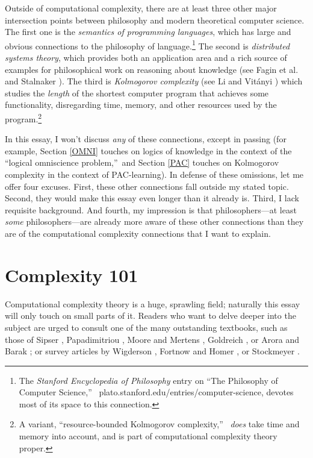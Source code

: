 \documentclass[12pt,onecolumn]{article}%
\begin{document}
Outside of computational complexity, there are at least three other major
intersection points between philosophy and modern theoretical computer
science. The first one is the \textit{semantics of programming languages},
which has large and obvious connections to the philosophy of
language.\footnote{The \textit{Stanford Encyclopedia of Philosophy} entry on
\textquotedblleft The Philosophy of Computer Science,\textquotedblright\ %
 plato.stanford.edu/entries/computer-science, devotes most of its space to
this connection.} The second is \textit{distributed systems theory}, which
provides both an application area and a rich source of examples for
philosophical work on reasoning about knowledge (see Fagin et al. \cite{fhmv}
and Stalnaker \cite{stalnaker}). The third is \textit{Kolmogorov complexity}
(see Li and Vit\'{a}nyi \cite{livitanyi}) which studies the \textit{length} of
the shortest computer program that achieves some functionality, disregarding
time, memory, and other resources used by the program.\footnote{A variant,
\textquotedblleft resource-bounded Kolmogorov complexity,\textquotedblright\ %
 \textit{does} take time and memory into account, and is part of
computational complexity theory proper.}

In this essay, I won't discuss \textit{any} of these connections, except in
passing (for example, Section \ref{OMNI} touches on logics of knowledge in
the context of the \textquotedblleft logical omniscience
problem,\textquotedblright\  and Section \ref{PAC} touches on Kolmogorov
complexity in the context of PAC-learning). In defense of these omissions,
let me offer four excuses. First, these other connections fall outside my
stated topic. Second, they would make this essay even longer than it already
is. Third, I lack requisite background. And fourth, my impression is that
philosophers---at least \textit{some} philosophers---are already more aware of
these other connections than they are of the computational complexity
connections that I want to explain.

\section{Complexity 101\label{C101}}

Computational complexity theory is a huge, sprawling field; naturally this
essay will only touch on small parts of it. Readers who want to delve
deeper into the subject are urged to consult one of the many outstanding
textbooks, such as those of Sipser \cite{sipser:book}, Papadimitriou
\cite{papa:book}, Moore and Mertens \cite{mooremertens}, Goldreich
\cite{goldreich:book}, or Arora and Barak \cite{arorabarak}; or survey
articles by Wigderson \cite{wigderson:survey1,wigderson:survey2}, Fortnow and
Homer \cite{fortnowhomer}, or Stockmeyer \cite{stockmeyer:survey}.
\end{document}

